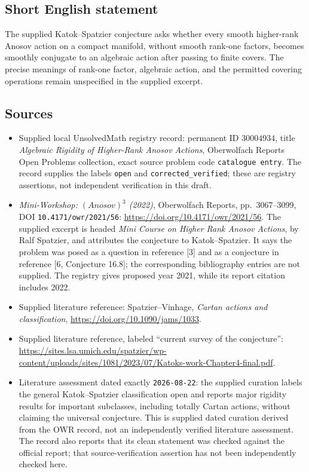 \documentclass[11pt]{article}
\begin{document}
\subsection{Short English statement}
The supplied Katok--Spatzier conjecture asks whether every smooth higher-rank Anosov action on a compact manifold, without smooth rank-one factors, becomes smoothly conjugate to an algebraic action after passing to finite covers. The precise meanings of rank-one factor, algebraic action, and the permitted covering operations remain unspecified in the supplied excerpt.
\subsection{Sources}
\begin{itemize}
\item Supplied local UnsolvedMath registry record: permanent ID \(30004934\), title \emph{Algebraic Rigidity of Higher-Rank Anosov Actions}, Oberwolfach Reports Open Problems collection, exact source problem code \texttt{catalogue entry}. The record supplies the labels \texttt{open} and \texttt{corrected\_verified}; these are registry assertions, not independent verification in this draft.
\item \emph{Mini-Workshop: \((Anosov)^3\) (2022)}, Oberwolfach Reports, pp.\ 3067--3099, DOI \texttt{10.4171/owr/2021/56}: \url{https://doi.org/10.4171/owr/2021/56}. The supplied excerpt is headed \emph{Mini Course on Higher Rank Anosov Actions}, by Ralf Spatzier, and attributes the conjecture to Katok--Spatzier. It says the problem was posed as a question in reference [3] and as a conjecture in reference [6, Conjecture 16.8]; the corresponding bibliography entries are not supplied. The registry gives proposed year 2021, while its report citation includes 2022.
\item Supplied literature reference: Spatzier--Vinhage, \emph{Cartan actions and classification}, \url{https://doi.org/10.1090/jams/1033}.
\item Supplied literature reference, labeled ``current survey of the conjecture'': \url{https://sites.lsa.umich.edu/spatzier/wp-content/uploads/sites/1081/2023/07/Katoks-work-Chapter4-final.pdf}.
\item Literature assessment dated exactly \texttt{2026-08-22}: the supplied curation labels the general Katok--Spatzier classification open and reports major rigidity results for important subclasses, including totally Cartan actions, without claiming the universal conjecture. This is supplied dated curation derived from the OWR record, not an independently verified literature assessment. The record also reports that its clean statement was checked against the official report; that source-verification assertion has not been independently checked here.
\end{itemize}
\end{document}
